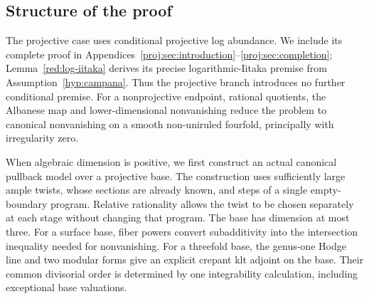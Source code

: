 \documentclass[11pt,letterpaper]{article}
\theoremstyle{definition}
\theoremstyle{remark}
\begin{document}
\subsection{Structure of the proof}

The projective case uses conditional projective log abundance. We
include its complete proof in
Appendices~\ref{proj:sec:introduction}--\ref{proj:sec:completion};
Lemma~\ref{red:log-iitaka} derives its precise logarithmic-Iitaka
premise from Assumption~\ref{hyp:campana}. Thus the projective
branch introduces no further conditional premise. For a
nonprojective endpoint, rational quotients, the Albanese map and
lower-dimensional nonvanishing reduce the problem to canonical
nonvanishing on a smooth non-uniruled fourfold, principally with
irregularity zero.

When algebraic dimension is positive, we first construct an actual
canonical pullback model over a projective base. The construction
uses sufficiently large ample twists, whose sections are already
known, and steps of a single empty-boundary program. Relative
rationality allows the twist to be chosen separately at each stage
without changing that program. The base has dimension at most three.
For a surface base, fiber powers convert subadditivity into the
intersection inequality needed for nonvanishing. For a threefold
base, the genus-one Hodge line and two modular forms give an
explicit crepant klt adjoint on the base. Their common divisorial
order is determined by one integrability calculation, including
exceptional base valuations.
\end{document}

